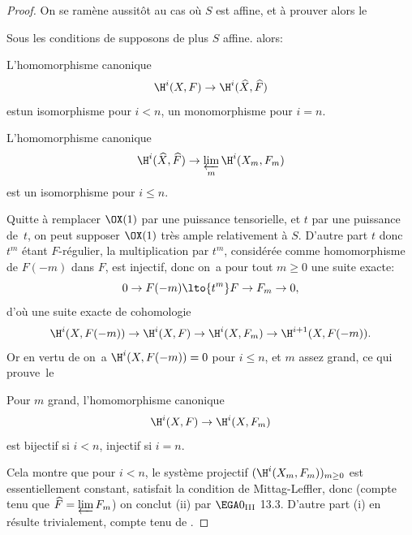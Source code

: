 \begin{proof}
On se ram\`ene aussit\^{o}t au cas o\`u $S$ est affine, et \`a prouver alors le

\begin{corollaire} \label{XII.2.2}
Sous les conditions de  supposons de plus $S$ affine. alors:
\begin{enumeratei}
\item
L'homomorphisme canonique
\[
\H^i(X, F) \to \H^i(\widehat{X}, \widehat{F})
\]
est\pageoriginale un isomorphisme pour $i<n$, un monomorphisme pour $i=n$.
\item
L'homomorphisme canonique
\[
\H^i(\widehat{X}, \widehat{F}) \to \varprojlim_m \H^i(X_m, F_m)
\]
est un isomorphisme pour $i\leq n$.
\end{enumeratei}
\end{corollaire}

Quitte \`a remplacer $\OX(1)$ par une puissance tensorielle, et $t$ par une puissance de~$t$, on peut supposer $\OX(1)$ tr\`es ample relativement \`a $S$. D'autre part $t$ donc $t^m$ \'etant $F$-r\'egulier, la multiplication par $t^m$, consid\'er\'ee comme homomorphisme de $F(-m)$ dans $F$, est injectif, donc on~a pour tout $m\geq 0$ une suite exacte:
\steco
\begin{equation} \label{eq:XII.14}
0\to F(-m) \lto{t^m} F \to F_m \to0,
\end{equation}
d'o\`u une suite exacte de cohomologie
\[
\H^i(X, F(-m)) \to \H^i(X, F) \to \H^i(X, F_m) \to \H^{i+1}(X, F(-m)).
\]
Or en vertu de  on~a $\H^i(X, F(-m))=0$ pour $i\leq n$, et $m$ assez grand, ce qui prouve~le

\begin{lemme} \label{XII.2.3}
Pour $m$ grand, l'homomorphisme canonique
\[
\H^i(X, F) \to \H^i(X, F_m)
\]
est bijectif si $i<n$, injectif si $i=n$.
\end{lemme}

\enlargethispage{-2\baselineskip}%
Cela montre que pour $i<n$, le syst\`eme projectif $(\H^i(X_m, F_m))_{m\geq 0}$ est essentiellement constant, \afortiori satisfait la condition de Mittag-Leffler, donc (compte tenu que $\widehat{F}= \varprojlim F_m$) on conclut (ii) par $\EGA 0_{\textup{III}}$ 13.3. D'autre part (i) en r\'esulte trivialement, compte tenu de .


\end{proof}
